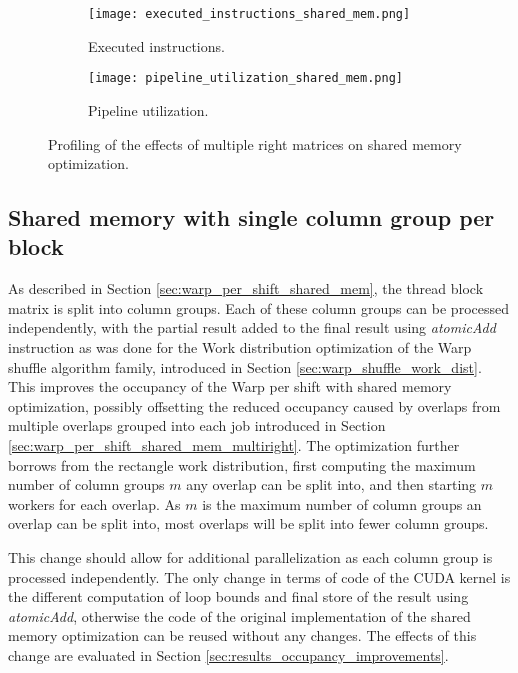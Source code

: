 \begin{figure}[ht]
	\centering	
	\begin{subfigure}{0.8\textwidth}
		\centering
		\texttt{[image: executed\_instructions\_shared\_mem.png]}
		\caption{Executed instructions.}
	\end{subfigure}
	\hfill
	\begin{subfigure}{0.8\textwidth}
		\centering
		\texttt{[image: pipeline\_utilization\_shared\_mem.png]}
		\caption{Pipeline utilization.}
	\end{subfigure}
	
	\caption{Profiling of the effects of multiple right matrices on shared memory optimization.}
	\label{fig:shared_memory_multimat_right_profiling}
\end{figure}

\subsection{Shared memory with single column group per block}
\label{sec:column_group_per_worker}
As described in Section \ref{sec:warp_per_shift_shared_mem}, the thread block matrix is split into column groups. Each of these column groups can be processed independently, with the partial result added to the final result using \textit{atomicAdd} instruction as was done for the Work distribution optimization of the Warp shuffle algorithm family, introduced in Section \ref{sec:warp_shuffle_work_dist}. This improves the occupancy of the Warp per shift with shared memory optimization, possibly offsetting the reduced occupancy caused by overlaps from multiple overlaps grouped into each job introduced in Section \ref{sec:warp_per_shift_shared_mem_multiright}. The optimization further borrows from the rectangle work distribution, first computing the maximum number of column groups $m$ any overlap can be split into, and then starting $m$ workers for each overlap. As $m$ is the maximum number of column groups an overlap can be split into, most overlaps will be split into fewer column groups.  

This change should allow for additional parallelization as each column group is processed independently. The only change in terms of code of the CUDA kernel is the different computation of loop bounds and final store of the result using \textit{atomicAdd}, otherwise the code of the original implementation of the shared memory optimization can be reused without any changes. The effects of this change are evaluated in Section \ref{sec:results_occupancy_improvements}.

